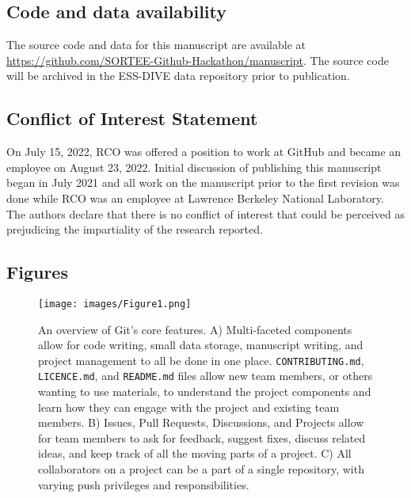\hypertarget{code-and-data-availability}{%
\subsection{Code and data availability}\label{code-and-data-availability}}

The source code and data for this manuscript are available at \url{https://github.com/SORTEE-Github-Hackathon/manuscript}.
The source code will be archived in the ESS-DIVE data repository prior to publication.

\hypertarget{conflict-of-interest-statement}{%
\subsection{Conflict of Interest Statement}\label{conflict-of-interest-statement}}

On July 15, 2022, RCO was offered a position to work at GitHub and became an employee on August 23, 2022.
Initial discussion of publishing this manuscript began in July 2021 and all work on the manuscript prior to the first revision was done while RCO was an employee at Lawrence Berkeley National Laboratory.
The authors declare that there is no conflict of interest that could be perceived as prejudicing the impartiality of the research reported.

\hypertarget{figures}{%
\subsection{Figures}\label{figures}}

\begin{figure}
\hypertarget{fig:github-diagram}{%
\centering
\texttt{[image: images/Figure1.png]}
\caption{An overview of Git's core features. A) Multi-faceted components allow for code writing, small data storage, manuscript writing, and project management to all be done in one place. \texttt{CONTRIBUTING.md}, \texttt{LICENCE.md}, and \texttt{README.md} files allow new team members, or others wanting to use materials, to understand the project components and learn how they can engage with the project and existing team members. B) Issues, Pull Requests, Discussions, and Projects allow for team members to ask for feedback, suggest fixes, discuss related ideas, and keep track of all the moving parts of a project. C) All collaborators on a project can be a part of a single repository, with varying push privileges and responsibilities.}\label{fig:github-diagram}
}
\end{figure}

